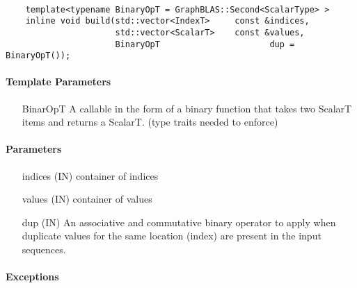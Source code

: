 {\paragraph{\syntax}

\begin{verbatim}
    template<typename BinaryOpT = GraphBLAS::Second<ScalarType> >
    inline void build(std::vector<IndexT>     const &indices,
                      std::vector<ScalarT>    const &values,
                      BinaryOpT                      dup = BinaryOpT());
\end{verbatim}

\paragraph{Template Parameters}

\begin{itemize}[leftmargin=1.1in]
    \item[{\sf BinarOpT}]    A callable in the form of a binary function
                             that takes two ScalarT items and returns a ScalarT. (type traits needed to enforce)
\end{itemize}

\paragraph{Parameters}

\begin{itemize}[leftmargin=1.1in]
    \item[{\sf indices}]  ({\sf IN}) container of indices
    \item[{\sf values}]   ({\sf IN}) container of values
    \item[{\sf dup}]      ({\sf IN}) An associative and commutative binary operator
                                     to apply when duplicate values for the same
                                     location (index) are present in the input sequences.
\end{itemize}

\paragraph{Exceptions}

}
